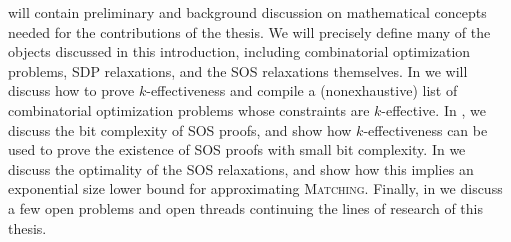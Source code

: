  will contain preliminary and background discussion on mathematical concepts needed for the contributions of the thesis. We will precisely define many of the objects discussed in this introduction, including combinatorial optimization problems, SDP relaxations, and the SOS relaxations themselves. In  we will discuss how to prove $k$-effectiveness and compile a (nonexhaustive) list of combinatorial optimization problems whose constraints are $k$-effective. In , we discuss the bit complexity of SOS proofs, and show how $k$-effectiveness can be used to prove the existence of SOS proofs with small bit complexity. In  we discuss the optimality of the SOS relaxations, and show how this implies an exponential size lower bound for approximating \textsc{Matching}. Finally, in  we discuss a few open problems and open threads continuing the lines of research of this thesis.